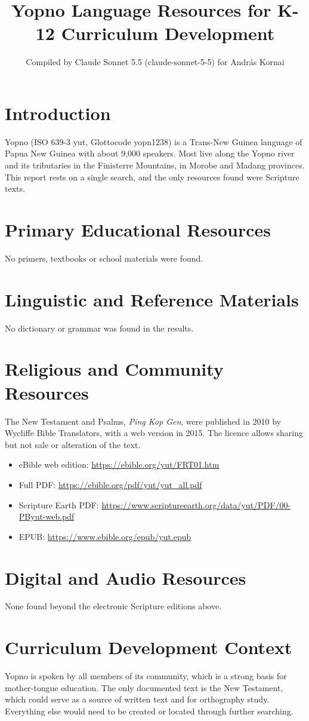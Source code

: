 \documentclass[12pt]{article}
\title{Yopno Language Resources for K-12 Curriculum Development}
\author{Compiled by Claude Sonnet 5.5 (claude-sonnet-5-5) for Andr\'as Kornai}
\date{}
\begin{document}
\maketitle

\section{Introduction}
Yopno (ISO 639-3 yut, Glottocode yopn1238) is a Trans-New Guinea language of Papua New Guinea with about 9,000 speakers. Most live along the Yopno river and its tributaries in the Finisterre Mountains, in Morobe and Madang provinces. This report rests on a single search, and the only resources found were Scripture texts.

\section{Primary Educational Resources}
No primers, textbooks or school materials were found.

\section{Linguistic and Reference Materials}
No dictionary or grammar was found in the results.

\section{Religious and Community Resources}
The New Testament and Psalms, \emph{Ping Kop Gen}, were published in 2010 by Wycliffe Bible Translators, with a web version in 2015. The licence allows sharing but not sale or alteration of the text.
\begin{itemize}
\item eBible web edition: \url{https://ebible.org/yut/FRT01.htm}
\item Full PDF: \url{https://ebible.org/pdf/yut/yut_all.pdf}
\item Scripture Earth PDF: \url{https://www.scriptureearth.org/data/yut/PDF/00-PByut-web.pdf}
\item EPUB: \url{https://www.ebible.org/epub/yut.epub}
\end{itemize}

\section{Digital and Audio Resources}
None found beyond the electronic Scripture editions above.

\section{Curriculum Development Context}
Yopno is spoken by all members of its community, which is a strong basis for mother-tongue education. The only documented text is the New Testament, which could serve as a source of written text and for orthography study. Everything else would need to be created or located through further searching.
\end{document}
